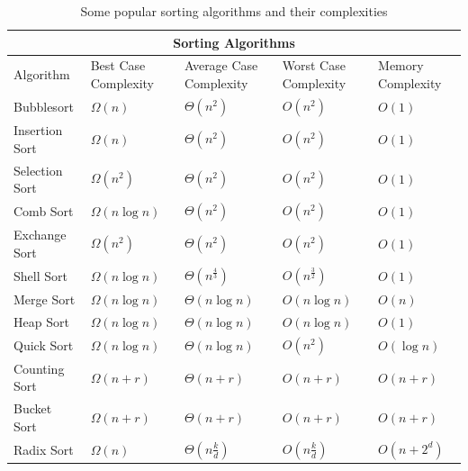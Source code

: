 \documentclass[12pt]{report}
\begin{document}
\begin{table}[h!]
    \begin{tabular}{ |p{2.5cm}||p{2.5cm}|p{2.5cm}|p{2.5cm}|p{2.5cm}|  }
        \hline
        \multicolumn{5}{|c|}{Sorting Algorithms} \\
        \hline
        \centering Algorithm& \centering Best Case Complexity & \centering Average Case Complexity&\centering Worst Case Complexity& Memory Complexity\\
        \hline
        \centering Bubblesort & \centering $\Omega(n)$ & \centering $\Theta(n^{2})$ & \centering $O(n^{2})$ & $O(1)$\\
        \hline
        \centering Insertion Sort & \centering $\Omega(n)$ & \centering $\Theta(n^{2})$ & \centering $O(n^{2})$ & $O(1)$\\
        \hline
        \centering Selection Sort & \centering $\Omega(n^{2})$ & \centering $\Theta(n^{2})$ & \centering $O(n^{2})$ & $O(1)$\\
        \hline
        \centering Comb Sort & \centering $\Omega(n\log n)$ & \centering $\Theta(n^{2})$ & \centering $O(n^{2})$ & $O(1)$\\
        \hline
        \centering Exchange Sort & \centering $\Omega(n^{2})$ & \centering $\Theta(n^{2})$ & \centering $O(n^{2})$ & $O(1)$\\
        \hline
        \centering Shell Sort & \centering $\Omega(n\log n)$ & \centering $\Theta(n^{\frac{4}{3}})$ & \centering $O(n^{\frac{3}{2}})$ & $O(1)$\\
        \hline
        \centering Merge Sort & \centering $\Omega(n\log n)$ & \centering $\Theta(n\log n)$ & \centering $O(n\log n)$ & $O(n)$\\
        \hline
        \centering Heap Sort & \centering $\Omega(n\log n)$ & \centering $\Theta(n\log n)$ & \centering $O(n\log n)$ & $O(1)$\\
        \hline
        \centering Quick Sort & \centering $\Omega(n\log n)$ & \centering $\Theta(n\log n)$ & \centering $O(n^{2})$ & $O(\log n)$\\
        \hline
        \centering Counting Sort & \centering $\Omega(n + r)$ & \centering $\Theta(n + r)$ & \centering $O(n + r)$ & $O(n + r)$\\
        \hline
        \centering Bucket Sort & \centering $\Omega(n + r)$ & \centering $\Theta(n + r)$ & \centering $O(n + r)$ & $O(n + r)$\\
        \hline
        \centering Radix Sort & \centering $\Omega(n)$ & \centering $\Theta(n\frac{k}{d})$ & \centering $O(n\frac{k}{d})$ & $O(n + 2^{d})$\\
        \hline
    \end{tabular}
    \caption{Some popular sorting algorithms and their complexities\cite{wikisort}}
\end{table}
\end{document}
